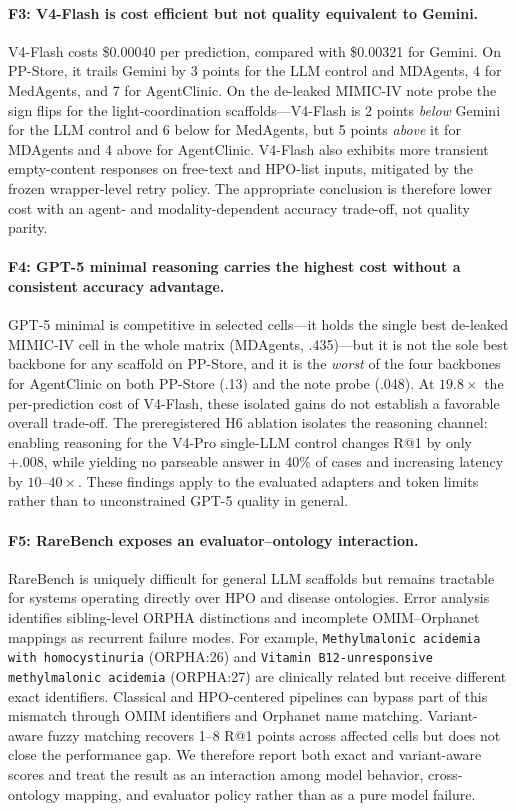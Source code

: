 \documentclass[letterpaper]{article} %
\begin{document}
\paragraph{F3: V4-Flash is cost efficient but not quality equivalent to Gemini.}
V4-Flash costs \$0.00040 per prediction, compared with \$0.00321 for Gemini. On PP-Store, it trails Gemini by 3 points for the LLM control and MDAgents, 4 for MedAgents, and 7 for AgentClinic. On the de-leaked MIMIC-IV note probe the sign flips for the light-coordination scaffolds---V4-Flash is 2 points \emph{below} Gemini for the LLM control and 6 below for MedAgents, but 5 points \emph{above} it for MDAgents and 4 above for AgentClinic. V4-Flash also exhibits more transient empty-content responses on free-text and HPO-list inputs, mitigated by the frozen wrapper-level retry policy. The appropriate conclusion is therefore lower cost with an agent- and modality-dependent accuracy trade-off, not quality parity.

\paragraph{F4: GPT-5 minimal reasoning carries the highest cost without a consistent accuracy advantage.}
GPT-5 minimal is competitive in selected cells---it holds the single best de-leaked MIMIC-IV cell in the whole matrix (MDAgents, .435)---but it is not the sole best backbone for any scaffold on PP-Store, and it is the \emph{worst} of the four backbones for AgentClinic on both PP-Store (.13) and the note probe (.048). At $19.8\times$ the per-prediction cost of V4-Flash, these isolated gains do not establish a favorable overall trade-off. The preregistered H6 ablation isolates the reasoning channel: enabling reasoning for the V4-Pro single-LLM control changes R@1 by only +.008, while yielding no parseable answer in 40\% of cases and increasing latency by $10$--$40\times$. These findings apply to the evaluated adapters and token limits rather than to unconstrained GPT-5 quality in general.

\paragraph{F5: RareBench exposes an evaluator--ontology interaction.}
RareBench is uniquely difficult for general LLM scaffolds but remains tractable for systems operating directly over HPO and disease ontologies. Error analysis identifies sibling-level ORPHA distinctions and incomplete OMIM--Orphanet mappings as recurrent failure modes. For example, \texttt{Methylmalonic acidemia with homocystinuria} (ORPHA:26) and \texttt{Vitamin B12-unresponsive methylmalonic acidemia} (ORPHA:27) are clinically related but receive different exact identifiers. Classical and HPO-centered pipelines can bypass part of this mismatch through OMIM identifiers and Orphanet name matching. Variant-aware fuzzy matching recovers 1--8 R@1 points across affected cells but does not close the performance gap. We therefore report both exact and variant-aware scores and treat the result as an interaction among model behavior, cross-ontology mapping, and evaluator policy rather than as a pure model failure.
\end{document}
